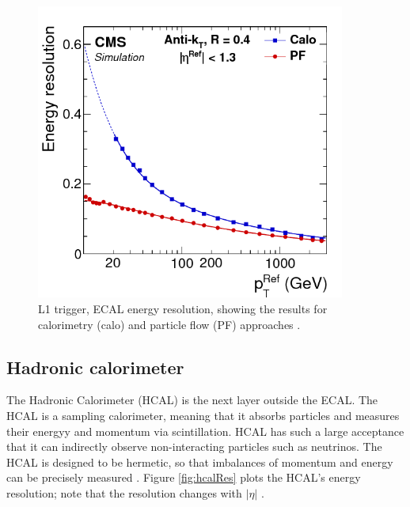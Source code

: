 \begin{figure}[]
\begin{centering}
\includegraphics[width=4in]{Chapter3/importfigs/Figure_013-a.png}
\par\end{centering}
\caption{L1 trigger, ECAL energy resolution, showing the results for calorimetry (calo) and particle flow (PF) approaches \cite{Bayatian:2006nff}.\label{fig:ecalResL1}}
\end{figure}
 
 
\subsection{Hadronic calorimeter}

The Hadronic Calorimeter (HCAL) is the next layer outside the ECAL. The HCAL is a sampling calorimeter, meaning that it absorbs particles and measures their energyy and momentum via scintillation. HCAL has such a large acceptance that it can indirectly observe non-interacting particles such as neutrinos. The HCAL is designed to be hermetic, so that imbalances of momentum and energy can be precisely measured \cite{Baiatian:2007xva}. Figure \ref{fig:hcalRes} plots the HCAL's energy resolution; note that the resolution changes with $|\eta|$ \cite{Bayatian:2006nff}.

